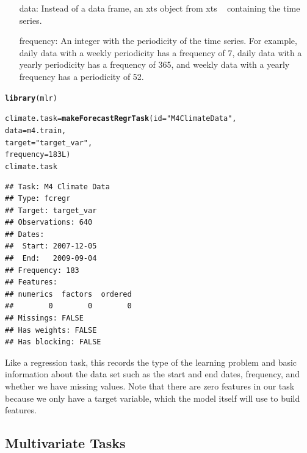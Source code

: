 \documentclass[12pt]{article}\usepackage[]{graphicx}\usepackage[]{color}
\makeatletter
\newcommand{\hlnum}[1]{\textcolor[rgb]{0.686,0.059,0.569}{#1}}%
\newcommand{\hlstr}[1]{\textcolor[rgb]{0.192,0.494,0.8}{#1}}%
\newcommand{\hlstd}[1]{\textcolor[rgb]{0.345,0.345,0.345}{#1}}%
\newcommand{\hlkwb}[1]{\textcolor[rgb]{0.69,0.353,0.396}{#1}}%
\newcommand{\hlkwc}[1]{\textcolor[rgb]{0.333,0.667,0.333}{#1}}%
\newcommand{\hlkwd}[1]{\textcolor[rgb]{0.737,0.353,0.396}{\textbf{#1}}}%
\newenvironment{kframe}{%
 \def\at@end@of@kframe{}%
 \ifinner\ifhmode%
  \def\at@end@of@kframe{\end{minipage}}%
  \begin{minipage}{\columnwidth}%
 \fi\fi%
 \def\FrameCommand##1{\hskip\@totalleftmargin \hskip-\fboxsep
 \colorbox{shadecolor}{##1}\hskip-\fboxsep
     \hskip-\linewidth \hskip-\@totalleftmargin \hskip\columnwidth}%
 \MakeFramed {\advance\hsize-\width
   \@totalleftmargin\z@ \linewidth\hsize
   \@setminipage}}%
 {\par\unskip\endMakeFramed%
 \at@end@of@kframe}
\newenvironment{knitrout}{}{} %
\theoremstyle{definition}
\newcommand{\pkg}[1]{{\fontseries{b}\selectfont #1}}
\makeatother
\begin{document}
\begin{itemize}
\item[data:] Instead of a data frame, an xts object from \pkg{xts} ~\cite{xts} containing the time series.
\item[frequency:] An integer with the periodicity of the time series. For example, daily data with a weekly periodicity has a frequency of 7, daily data with a yearly periodicity has a frequency of 365, and weekly data with a yearly frequency has a periodicity of 52.
\end{itemize}

\singlespacing
\begin{knitrout}
\color{fgcolor}\begin{kframe}
\begin{alltt}
\hlkwd{library}\hlstd{(mlr)}

\hlstd{climate.task} \hlkwb{=} \hlkwd{makeForecastRegrTask}\hlstd{(}\hlkwc{id} \hlstd{=} \hlstr{"M4 Climate Data"}\hlstd{,}
                                 \hlkwc{data} \hlstd{= m4.train,}
                                 \hlkwc{target} \hlstd{=} \hlstr{"target_var"}\hlstd{,}
                                 \hlkwc{frequency} \hlstd{=} \hlnum{183L}\hlstd{)}
\hlstd{climate.task}
\end{alltt}
\begin{verbatim}
## Task: M4 Climate Data
## Type: fcregr
## Target: target_var
## Observations: 640
## Dates:
##  Start: 2007-12-05 
##  End:   2009-09-04
## Frequency: 183
## Features:
## numerics  factors  ordered 
##        0        0        0 
## Missings: FALSE
## Has weights: FALSE
## Has blocking: FALSE
\end{verbatim}
\end{kframe}
\end{knitrout}
\doublespacing
Like a regression task, this records the type of the learning problem and basic information about the data set such as the start and end dates, frequency, and whether we have missing values. Note that there are zero features in our task because we only have a target variable, which the model itself will use to build features.

\subsection{Multivariate Tasks}
\end{document}
